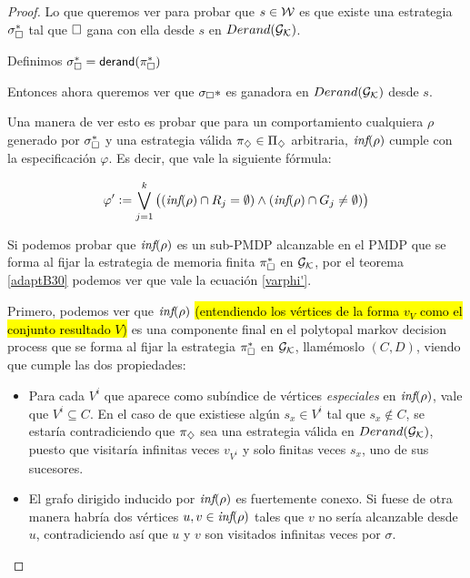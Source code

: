 \begin{proof}
	Lo que queremos ver para probar que $s \in \mathcal{W}$ es que existe una estrategia
	$\sigma_\square^*$ tal que $\square$ gana con ella desde $s$ en $Derand(\mathcal{G}_{\mathcal{K}})$.

	Definimos $\sigma_\square^* = \textsf{derand}(\pi_\square^*)$

	Entonces ahora queremos ver que $\sigma_\square*$ es ganadora en $Derand(\mathcal{G}_{\mathcal{K}})$ desde
	$s$.

	Una manera de ver esto es probar que para un comportamiento cualquiera $\rho$
	generado por $\sigma_\square^*$ y una estrategia válida $\pi_\diamondsuit \in \Pi_\diamondsuit$
	arbitraria, $\textit{inf}(\rho)$ cumple con la especificación $\varphi$. Es decir, que
	vale la siguiente fórmula:


	\begin{equation}
		\label{varphi'}
		\varphi' := \bigvee_{j = 1}^{k} \left((\textit{inf}(\rho) \cap R_j = \emptyset) \wedge (\textit{inf}(\rho) \cap G_j \neq \emptyset)  \right)
	\end{equation}

	Si podemos probar que $\textit{inf}(\rho)$ es un sub-PMDP alcanzable en el PMDP que se
	forma al fijar la estrategia de memoria finita $\pi_\square^*$ en $\mathcal{G}_{\mathcal{K}}$, por el
	teorema \ref{adaptB30} podemos ver que vale la ecuación \ref{varphi'}.

	Primero, podemos ver que $\textit{inf}(\rho)$ \hl{(entendiendo los vértices de la
		forma $v_V$ como el conjunto resultado $V$)} es una componente final en el
	polytopal markov decision process que se forma al fijar la estrategia
	$\pi_\square^*$ en $\mathcal{G}_{\mathcal{K}}$, llamémoslo $(C,D)$, viendo que cumple las dos
	propiedades:

	\begin{itemize}
		\item Para cada $V^i$ que aparece como subíndice de vértices \textit{especiales} en
		      $\textit{inf}(\rho)$, vale que $V^i \subseteq C$. En el caso de que existiese algún
		      $s_x \in V^i$ tal que $s_x \notin C$, se estaría contradiciendo que $\pi_\diamondsuit$
		      sea una estrategia válida en $Derand(\mathcal{G}_{\mathcal{K}})$, puesto que visitaría infinitas veces
		      $v_{V^i}$ y solo finitas veces $s_x$, uno de sus sucesores.
		\item El grafo dirigido inducido por $\textit{inf}(\rho)$ es fuertemente conexo. Si fuese de
		      otra manera habría dos vértices $u, v \in \textit{inf}(\rho)$ tales que $v$ no sería
		      alcanzable desde $u$, contradiciendo así que $u$ y $v$ son visitados infinitas
		      veces por $\sigma$.
	\end{itemize}


\end{proof}
